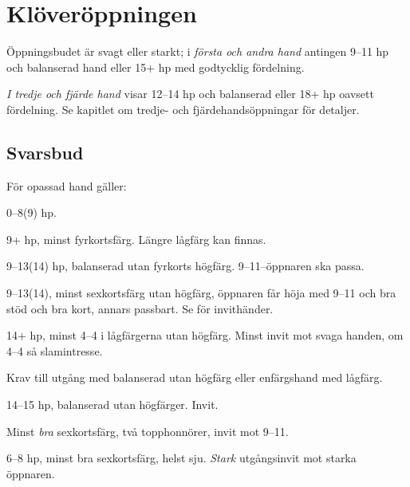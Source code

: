 \chapter{Kl\"over\"oppningen}

\"Oppningsbudet  \"ar svagt eller starkt; i {\em f\"orsta och andra hand}
antingen 9--11 hp och balanserad hand eller 15+ hp med godtycklig f\"ordelning.

{\em I tredje och fj{\"a}rde hand}
 visar  12--14 hp och balanserad eller 18+ hp oavsett fördelning.
Se kapitlet om tredje- och fj\"ardehands\"oppningar f\"or detaljer.

\section{Svarsbud}

F{\"o}r opassad hand g{\"a}ller:

\bbe
   \item[--\ru{1}] 0--8(9) hp.

   \item[--\ho{1}] 9+ hp, minst fyrkortsf\"arg. L\"angre l{\aa}gf\"arg 
                  kan finnas.

   \item[--\NT{1}] 9--13(14) hp, balanserad utan fyrkorts h\"ogf\"arg.
               9--11--\"oppnaren ska passa.

   \item[--\la{2}] 9--13(14), minst sexkortsfärg utan högfärg, öppnaren får
     höja med 9--11 och bra stöd och bra kort, annars passbart. Se 
     för invithänder. 
        

   \item[--\hj{2}] 14+ hp, minst 4--4 i lågfärgerna utan högfärg. Minst invit
     mot svaga handen, om 4--4 så slamintresse.

   \item[--\spa{2}] Krav till utgång med balanserad utan högfärg eller
     enfärgshand med lågfärg.

   \item[--\NT{2}] 14--15 hp, balanserad utan h\"ogf\"arger. Invit.

   \item[--\la{3}] Minst {\em bra} sexkortsf\"arg, två
     topphonnörer,
                  invit mot 9--11.

   \item[--\ho{3}] 6--8 hp, minst bra sexkortsf\"arg, helst sju. {\em Stark}
                    utg{\aa}ngsinvit mot starka \"oppnaren.

